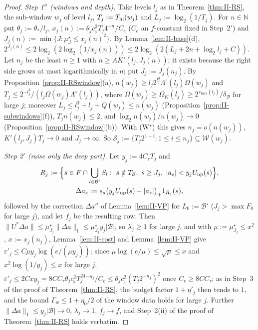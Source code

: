 \documentclass[10pt]{amsart}
\theoremstyle{definition}
\theoremstyle{remark}
\newcommand{\N}{\mathbb N}
\begin{document}
\begin{proof}
\emph{Step 1$''$ (windows and depth).}  Take levels $l_j$ as in
Theorem~\ref{thm:II-RS}, the sub-window $w_j$ of level $l_j$, $T_j:=
T_{\rm hi}(w_j)$ and $L_j:=\log_2(1/T_j)$.  For $n\in\N$ put
$\theta_j:=\theta_*/l_j$, $x_j(n):=\theta_jc_\flat^2T_j4^{-n}/C_e$ ($C_e$ an
$f$-constant fixed in Step~2$'$) and $J_j(n):=\min\{J:\mu^\star_J\le
x_j(n)^2\}$.  By Lemma~\ref{lem:II-base}(d), $2^{J_j(n)}\le2\log_2(2\log_2(1/
x_j(n)))\le2\log_2(2(L_j+2n+\log_2l_j+C))$.  Let $n_j$ be the least $n\ge1$ with $n\ge
AK'(l_j,J_j(n))$; it exists because the right side grows at most
logarithmically in $n$; put $J_j:=J_j(n_j)$.  By Proposition~\ref{prop:II-RSwindow}(a),
$n(w_j)\ge l_j2^{l_j^3}\Lambda^\circ(l_j)\Omega(w_j)$ and $T_j\le2^{-l_j^3}/
(l_j\Omega(w_j)\Lambda^\circ(l_j))$, where $\Omega(w_j)\ge\Omega_K(l_j)\ge
2^{s_{\max}(l_j)}/\delta_{\mathcal B}$ for large $j$; moreover
$L_j\le l_j^3+l_j+Q(w_j)\le n(w_j)$ (Proposition~\ref{prop:II-subwindows}(f)),
$T_jn(w_j)\le2$, and $\log_2n(w_j)/n(w_j)\to0$
(Proposition~\ref{prop:II-RSwindow}(b)).  With (W$^\star$) this gives
$n_j=o(n(w_j))$, $K'(l_j,J_j)T_j\to0$ and $J_j\to\infty$.  So
$\mathcal S_j:=\{T_j2^{1-i}:1\le i\le n_j\}\subseteq\mathcal W(w_j)$.

\emph{Step 2$'$ (raise only the deep part).}  Let $y_j:=4C_\tau T_j$ and
\begin{gather*}
 R_j:=\Big\{s\in F\cap\bigcup_{l\in\mathcal B'}S_l:\ s\notin T_{\mathcal B},\
 s\ge J_j,\ |a_s|<y_jU_{\rm np}(s)\Big\},\\ \Delta a_s:=s_s\big(y_j
 U_{\rm np}(s)-|a_s|\big)_+1_{R_j}(s),
\end{gather*}
followed by the correction $\Delta a''$ of Lemma~\ref{lem:II-VP} for
$L_0:=\mathcal B'$ ($J_j>\max F_0$ for large $j$), and let $f_j$ be the
resulting row.  Then $\|U^*\Delta a\|\le\mu^\star_{J_j}\|\Delta a\|_1\le
\mu^\star_{J_j}y_j|\mathcal B|$, so $\lambda_j\ge1$ for large $j$, and with
$\mu:=\mu^\star_{J_j}\le x^2$, $x:=x_j(n_j)$, Lemma~\ref{lem:II-cost} and
Lemma~\ref{lem:II-VP} give $\varepsilon'_j\le C\mu y_j\log(e/(\mu y_j))$; since
$\mu\log(e/\mu)\le\sqrt\mu\le x$ and $x^2\log(1/y_j)\le x$ for large $j$,
$\varepsilon'_j\le2Cxy_j=8CC_\tau\theta_jc_\flat^2T_j^24^{-n_j}/C_e\le\theta_j
c_\flat^2(T_j2^{-n_j})^2$ once $C_e\ge8CC_\tau$; as in Step~3 of the proof of
Theorem~\ref{thm:II-RS}, the budget factor $1+\eta'_j$ then tends to $1$, and
the bound $\Gamma_w\le1+\eta_0/2$ of the window data holds for large $j$.  Further $\|\Delta a\|_1\le
y_j|\mathcal B|\to0$, $\lambda_j\to1$, $f_j\to f$, and Step~2(ii) of the
proof of Theorem~\ref{thm:II-RS} holds verbatim.


\end{proof}
\end{document}
